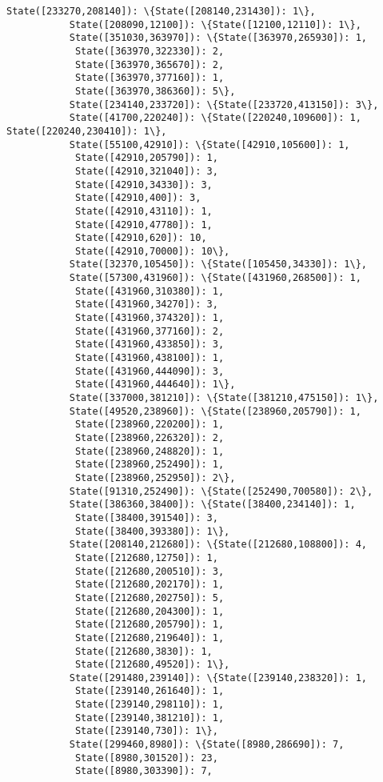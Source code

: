 \documentclass[11pt]{article}
\begin{document}
\begin{Verbatim}[commandchars=\\\{\}]
           State([233270,208140]): \{State([208140,231430]): 1\},
           State([208090,12100]): \{State([12100,12110]): 1\},
           State([351030,363970]): \{State([363970,265930]): 1,
            State([363970,322330]): 2,
            State([363970,365670]): 2,
            State([363970,377160]): 1,
            State([363970,386360]): 5\},
           State([234140,233720]): \{State([233720,413150]): 3\},
           State([41700,220240]): \{State([220240,109600]): 1, State([220240,230410]): 1\},
           State([55100,42910]): \{State([42910,105600]): 1,
            State([42910,205790]): 1,
            State([42910,321040]): 3,
            State([42910,34330]): 3,
            State([42910,400]): 3,
            State([42910,43110]): 1,
            State([42910,47780]): 1,
            State([42910,620]): 10,
            State([42910,70000]): 10\},
           State([32370,105450]): \{State([105450,34330]): 1\},
           State([57300,431960]): \{State([431960,268500]): 1,
            State([431960,310380]): 1,
            State([431960,34270]): 3,
            State([431960,374320]): 1,
            State([431960,377160]): 2,
            State([431960,433850]): 3,
            State([431960,438100]): 1,
            State([431960,444090]): 3,
            State([431960,444640]): 1\},
           State([337000,381210]): \{State([381210,475150]): 1\},
           State([49520,238960]): \{State([238960,205790]): 1,
            State([238960,220200]): 1,
            State([238960,226320]): 2,
            State([238960,248820]): 1,
            State([238960,252490]): 1,
            State([238960,252950]): 2\},
           State([91310,252490]): \{State([252490,700580]): 2\},
           State([386360,38400]): \{State([38400,234140]): 1,
            State([38400,391540]): 3,
            State([38400,393380]): 1\},
           State([208140,212680]): \{State([212680,108800]): 4,
            State([212680,12750]): 1,
            State([212680,200510]): 3,
            State([212680,202170]): 1,
            State([212680,202750]): 5,
            State([212680,204300]): 1,
            State([212680,205790]): 1,
            State([212680,219640]): 1,
            State([212680,3830]): 1,
            State([212680,49520]): 1\},
           State([291480,239140]): \{State([239140,238320]): 1,
            State([239140,261640]): 1,
            State([239140,298110]): 1,
            State([239140,381210]): 1,
            State([239140,730]): 1\},
           State([299460,8980]): \{State([8980,286690]): 7,
            State([8980,301520]): 23,
            State([8980,303390]): 7,

\end{Verbatim}
\end{document}
